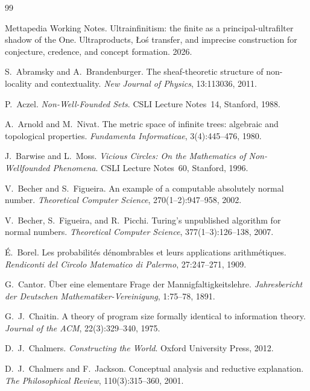 \documentclass[]{article}
\theoremstyle{definition}
\theoremstyle{remark}
\begin{document}
\begin{thebibliography}{99}

 Mettapedia Working Notes. Ultrainfinitism: the finite as a principal-ultrafilter shadow
of the One. Ultraproducts, {\L}o\'s transfer, and imprecise construction for conjecture, credence,
and concept formation. 2026.

 S.~Abramsky and A.~Brandenburger. The sheaf-theoretic structure
of non-locality and contextuality. \emph{New Journal of Physics}, 13:113036, 2011.

 P.~Aczel. \emph{Non-Well-Founded Sets}. CSLI Lecture Notes~14, Stanford, 1988.

 A.~Arnold and M.~Nivat. The metric space of infinite trees: algebraic and
topological properties. \emph{Fundamenta Informaticae}, 3(4):445--476, 1980.

 J.~Barwise and L.~Moss. \emph{Vicious Circles: On the Mathematics of
Non-Wellfounded Phenomena}. CSLI Lecture Notes~60, Stanford, 1996.

 V.~Becher and S.~Figueira. An example of a computable absolutely normal
number. \emph{Theoretical Computer Science}, 270(1--2):947--958, 2002.

 V.~Becher, S.~Figueira, and R.~Picchi. Turing's unpublished
algorithm for normal numbers. \emph{Theoretical Computer Science}, 377(1--3):126--138, 2007.

 \'E.~Borel. Les probabilit\'es d\'enombrables et leurs applications
arithm\'etiques. \emph{Rendiconti del Circolo Matematico di Palermo}, 27:247--271, 1909.

 G.~Cantor. \"Uber eine elementare Frage der Mannigfaltigkeitslehre.
\emph{Jahresbericht der Deutschen Mathematiker-Vereinigung}, 1:75--78, 1891.

 G.~J.~Chaitin. A theory of program size formally identical to information
theory. \emph{Journal of the ACM}, 22(3):329--340, 1975.

 D.~J.~Chalmers. \emph{Constructing the World}. Oxford University Press, 2012.

 D.~J.~Chalmers and F.~Jackson. Conceptual analysis and reductive
explanation. \emph{The Philosophical Review}, 110(3):315--360, 2001.


\end{thebibliography}
\end{document}
